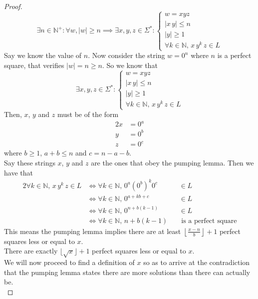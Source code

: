 \documentclass[docid=TP07]{tcom_TP}
\begin{document}
{\begin{proof}
\begin{equation*}
	\exists n \in \mathbb{N}^+ \colon \forall w, |w|\geq n \implies \exists x, y, z \in \Sigma^* \colon 
	\begin{cases}
		w = xyz \\
		|x\,y| \leq n\\
		|y| \geq 1\\
		\forall k \in \mathbb{N},\,x\,y^k\,z \in L
\end{cases}
\end{equation*}
Say we know the value of $n$. Now consider the string $w=0^n$ where $n$ is a perfect square, that verifies $|w|=n \geq n$. So we know that
\begin{equation*}
\exists x, y, z \in \Sigma^* \colon 
\begin{cases}
	w = xyz \\
	|x\,y| \leq n\\
	|y| \geq 1\\
	\forall k \in \mathbb{N},\,x\,y^k\,z \in L
\end{cases}
\end{equation*}
Then, $x$, $y$ and $z$ must be of the form
\begin{alignat*}{2}
	x &= 0^a\\
	y &= 0^b\\
	z &= 0^c
\end{alignat*}
where $b \geq 1$, $a+b \leq n$ and $c=n-a-b$.\\
Say these strings $x$, $y$ and $z$ are the ones that obey the pumping lemma. Then we have that
\begin{alignat*}{2}
	\forall k \in \mathbb{N},\,x\,y^k\,z \in L
	& \iff \forall k \in \mathbb{N},\,0^a(0^b)^k0^c && \in L \\
	& \iff \forall k \in \mathbb{N},\,0^{a+kb+c}    && \in L \\
	& \iff \forall k \in \mathbb{N},\,0^{n+b(k-1)}  && \in L \\
	& \iff \forall k \in \mathbb{N},\,n+b(k-1)      && \text{ is a perfect square}
\end{alignat*}
This means the pumping lemma implies there are at least $\left\lfloor \frac{x-n}{b} \right\rfloor +1$ perfect squares less or equal to $x$.\\
There are exactly $\lfloor \sqrt{x} \rfloor +1$ perfect squares less or equal to $x$.\\
We will now proceed to find a definition of $x$ so as to arrive at the contradiction that the pumping lemma states there are more solutions than there can actually be.\\

\end{proof}}
\end{document}
